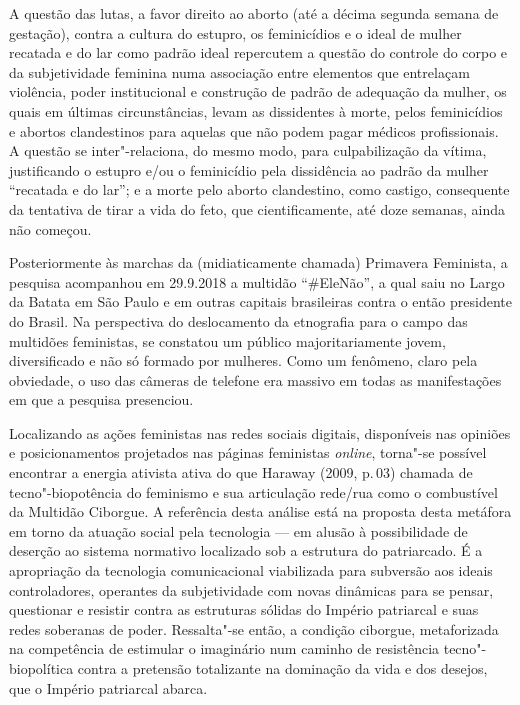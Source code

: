 A questão das lutas, a favor direito ao aborto (até a décima segunda
semana de gestação), contra a cultura do estupro, os feminicídios e o
ideal de mulher recatada e do lar como padrão ideal repercutem a questão
do controle do corpo e da subjetividade feminina numa associação entre
elementos que entrelaçam violência, poder institucional e construção de
padrão de adequação da mulher, os quais em últimas circunstâncias, levam
as dissidentes à morte, pelos feminicídios e abortos clandestinos para
aquelas que não podem pagar médicos profissionais. A questão se
inter"-relaciona, do mesmo modo, para culpabilização da vítima,
justificando o estupro e/ou o feminicídio pela dissidência ao padrão da
mulher ``recatada e do lar''; e a morte pelo aborto clandestino, como
castigo, consequente da tentativa de tirar a vida do feto, que
cientificamente, até doze semanas, ainda não começou.

Posteriormente às marchas da (midiaticamente chamada) Primavera
Feminista, a pesquisa acompanhou em 29.9.2018 a multidão ``\#EleNão'',
a qual saiu no Largo da Batata em São Paulo e em outras capitais
brasileiras contra o então presidente do Brasil. Na perspectiva do
deslocamento da etnografia para o campo das multidões feministas, se
constatou um público majoritariamente jovem, diversificado e não só
formado por mulheres. Como um fenômeno, claro pela obviedade, o uso das
câmeras de telefone era massivo em todas as manifestações em que a
pesquisa presenciou.

Localizando as ações feministas nas redes sociais digitais, disponíveis
nas opiniões e posicionamentos projetados nas páginas feministas
\emph{online}, torna"-se possível encontrar a energia ativista ativa do que
Haraway (2009, p.\,03) chamada de tecno"-biopotência do feminismo e sua
articulação rede/rua como o combustível da Multidão Ciborgue. A
referência desta análise está na proposta desta metáfora em torno da
atuação social pela tecnologia --- em alusão à possibilidade de deserção
ao sistema normativo localizado sob a estrutura do patriarcado. É a
apropriação da tecnologia comunicacional viabilizada para subversão aos
ideais controladores, operantes da subjetividade com novas dinâmicas
para se pensar, questionar e resistir contra as estruturas sólidas do
Império patriarcal e suas redes soberanas de poder. Ressalta"-se então, a
condição ciborgue, metaforizada na competência de estimular o imaginário
num caminho de resistência tecno"-biopolítica contra a pretensão
totalizante na dominação da vida e dos desejos, que o Império patriarcal
abarca.

